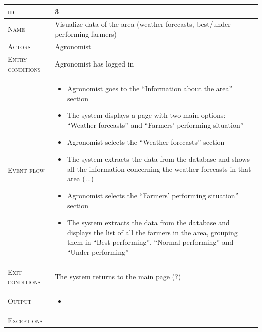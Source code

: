 \begin{table}[H]
    \centering
    \begin{tabular}[c]{|l|p{}|}
        \hline %
    	\textsc{id}                 &   3\\
    	\hline %
    	\textsc{Name}               &   Visualize data of the area (weather forecasts, best/under performing farmers)\\
    	\hline %
    	\textsc{Actors}             &   Agronomist\\
    	\hline %
    	\textsc{Entry conditions}   &   Agronomist has logged in\\
    	\hline %
    	\textsc{Event flow}         &   %
            	                        \begin{itemize}
                                    	    \item Agronomist goes to the “Information about the area” section
                                    		\item The system displays a page with two main options: “Weather forecasts” and “Farmers’ performing situation”
                                    		\item Agronomist selects  the “Weather forecasts” section
                                    		\item The system extracts the data from the database and shows all the information concerning the weather forecasts in that area (...)
                                    		\item Agronomist selects the “Farmers’ performing situation” section
                                    		\item The system extracts the data from the database and displays the list of all the farmers in the area, grouping them in “Best performing”, “Normal performing” and “Under-performing”
                                        \end{itemize}\\
        \hline %
        \textsc{Exit conditions}    &  The system returns to the main page (?)\\
    	\hline %
    	\textsc{Output}             &  \begin{itemize}
    	    \item %
    	\end{itemize}\\
    	\hline %
    	\textsc{Exceptions}         &  %
    	\\
    	\hline %
        

\end{tabular}
\end{table}

